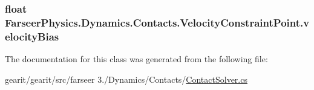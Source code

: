 \hypertarget{class_farseer_physics_1_1_dynamics_1_1_contacts_1_1_velocity_constraint_point_a1314b28dc03d13ef54cc872717cff261}{
\subsubsection[{velocity\+Bias}]{\setlength{\rightskip}{0pt plus 5cm}float Farseer\+Physics.\+Dynamics.\+Contacts.\+Velocity\+Constraint\+Point.\+velocity\+Bias}}\label{class_farseer_physics_1_1_dynamics_1_1_contacts_1_1_velocity_constraint_point_a1314b28dc03d13ef54cc872717cff261}


The documentation for this class was generated from the following file\+:\begin{DoxyCompactItemize}
\item 
gearit/gearit/src/farseer 3./\+Dynamics/\+Contacts/\hyperlink{_contact_solver_8cs}{Contact\+Solver.\+cs}\end{DoxyCompactItemize}
